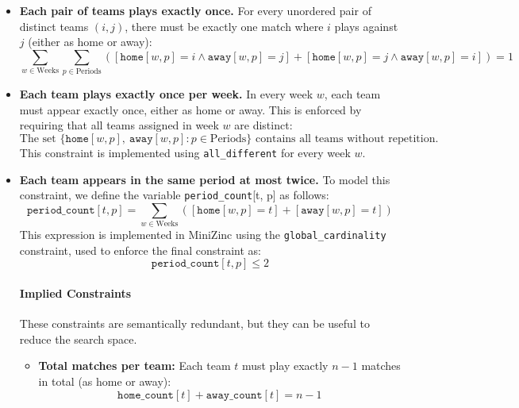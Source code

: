\documentclass[11pt]{article}
\begin{document}
\begin{itemize} 
    \item \textbf{Each pair of teams plays exactly once.}  
    For every unordered pair of distinct teams $(i, j)$, there must be exactly one match where $i$ plays against $j$ (either as home or away):
    \begin{equation*}
        \sum_{w \in \text{Weeks}} \sum_{p \in \text{Periods}} \left( [\texttt{home}[w,p] = i \land \texttt{away}[w,p] = j] + [\texttt{home}[w,p] = j \land \texttt{away}[w,p] = i] \right) = 1
    \end{equation*}

    \item \textbf{Each team plays exactly once per week.}  
    In every week $w$, each team must appear exactly once, either as home or away. This is enforced by requiring that all teams assigned in week $w$ are distinct:
    \begin{equation*}
        \text{The set } \{\texttt{home}[w,p],\ \texttt{away}[w,p] : p \in \text{Periods}\} \text{ contains all teams without repetition.}
    \end{equation*}
    This constraint is implemented using \texttt{all\_different} for every week $w$.

    \item \textbf{Each team appears in the same period at most twice.}  
    To model this constraint, we define the variable \texttt{period\_count}[t, p] as follows:
    \begin{equation*}
        \texttt{period\_count}[t, p] = \sum_{w \in \text{Weeks}} \left( [\texttt{home}[w,p] = t] + [\texttt{away}[w,p] = t] \right)
    \end{equation*}
    This expression is implemented in MiniZinc using the \texttt{global\_cardinality} constraint, used to enforce the final constraint as:
    \begin{equation*}
        \texttt{period\_count}[t, p] \leq 2
    \end{equation*}



\paragraph{Implied Constraints}
These constraints are semantically redundant, but they can be useful to reduce the search space.

\begin{itemize}
    \item \textbf{Total matches per team:}  
    Each team $t$ must play exactly $n-1$ matches in total (as home or away):
    \begin{equation*}
        \texttt{home\_count}[t] + \texttt{away\_count}[t] = n - 1
    \end{equation*}


\end{itemize}
\end{itemize}
\end{document}
